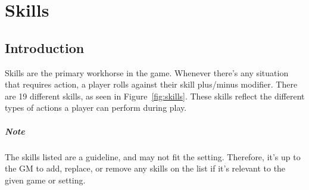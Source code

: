 \chapter{Skills} \label{chap:skills}
\section{Introduction}
Skills are the primary workhorse in the game. 
Whenever there's any situation that requires action, a player rolls against their skill plus/minus modifier. 
There are 19 different skills, as seen in Figure~\ref{fig:skills}. 
These skills reflect the different types of actions a player can perform during play.

\paragraph{Note} The skills listed are a guideline, and may not fit the setting. Therefore, it's up to the GM to add, replace, or remove any skills on the list if it's relevant to the given game or setting.






